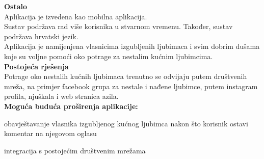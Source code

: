 		\textbf{Ostalo}\\
		Aplikacija je izvedena kao mobilna aplikacija.\\
		Sustav podržava rad više korisnika u stvarnom vremenu. Također, sustav podržava hrvatski jezik.\\
		Aplikacija je namijenjena vlasnicima izgubljenih ljubimaca i svim dobrim dušama koje su voljne pomoći oko potrage za nestalim kućnim ljubimcima.\\
		
		\textbf{Postojeća rješenja}\\
		Potrage oko nestalih kućnih ljubimaca trenutno se odvijaju putem društvenih mreža, na primjer facebook grupa za nestale i nađene ljubimce, putem instagram profila, njuškala i web stranica azila.\\
		
		\textbf{Moguća buduća proširenja aplikacije:}
		\begin{packed_item}
			\item obavještavanje vlasnika izgubljenog kućnog ljubimca nakon što korisnik ostavi komentar na njegovom oglasu
			\item integracija s postojećim društvenim mrežama
		\end{packed_item}
		
		
		\eject
		
		
